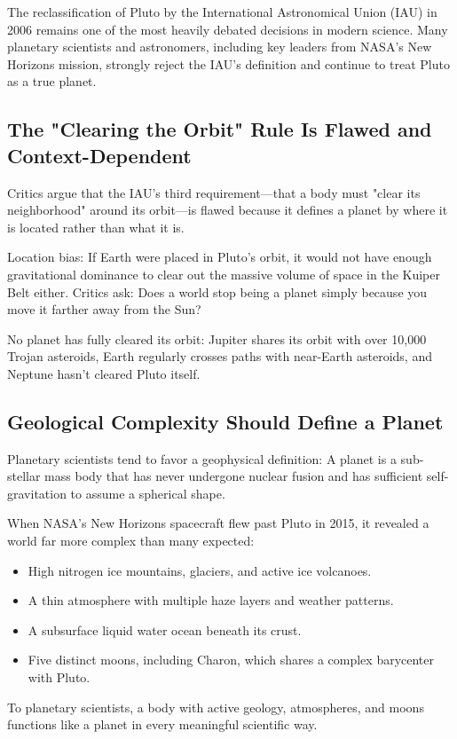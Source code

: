 The reclassification of Pluto by the International Astronomical Union (IAU) in 2006 remains one of the most heavily debated decisions in modern science. Many planetary scientists and astronomers, including key leaders from NASA’s New Horizons mission, strongly reject the IAU's definition and continue to treat Pluto as a true planet.

\subsection{The "Clearing the Orbit" Rule Is Flawed and Context-Dependent}
Critics argue that the IAU’s third requirement—that a body must "clear its neighborhood" around its orbit—is flawed because it defines a planet by where it is located rather than what it is.

Location bias: If Earth were placed in Pluto’s orbit, it would not have enough gravitational dominance to clear out the massive volume of space in the Kuiper Belt either. Critics ask: Does a world stop being a planet simply because you move it farther away from the Sun?

No planet has fully cleared its orbit: Jupiter shares its orbit with over 10,000 Trojan asteroids, Earth regularly crosses paths with near-Earth asteroids, and Neptune hasn't cleared Pluto itself.

\subsection{ Geological Complexity Should Define a Planet}
Planetary scientists tend to favor a geophysical definition: A planet is a sub-stellar mass body that has never undergone nuclear fusion and has sufficient self-gravitation to assume a spherical shape.

When NASA's New Horizons spacecraft flew past Pluto in 2015, it revealed a world far more complex than many expected:
\begin{itemize}
   \item 
High nitrogen ice mountains, glaciers, and active ice volcanoes.
   \item 
A thin atmosphere with multiple haze layers and weather patterns.
   \item 
A subsurface liquid water ocean beneath its crust.
   \item 
Five distinct moons, including Charon, which shares a complex barycenter with Pluto.
\end{itemize}
To planetary scientists, a body with active geology, atmospheres, and moons functions like a planet in every meaningful scientific way.


